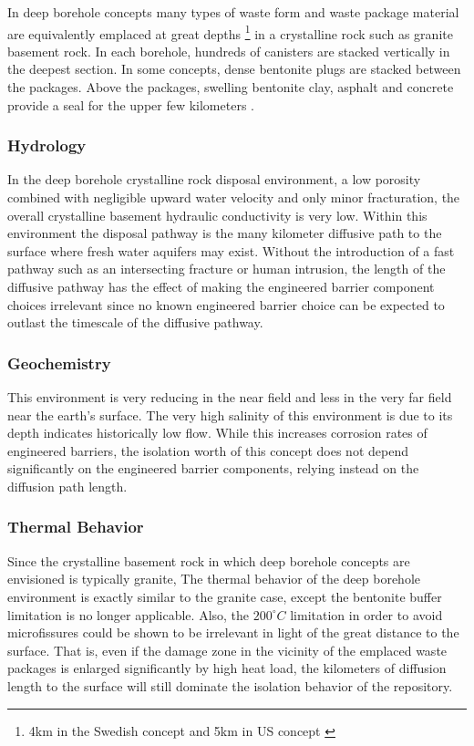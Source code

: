 In deep borehole concepts many types of  waste form and waste package material 
are equivalently emplaced at great depths \footnote{4km in the Swedish concept 
and 5km in \gls{US} concept \cite{hardin_generic_2011, clayton_generic_2011} }
in a crystalline rock such as granite basement rock. In each borehole, hundreds
of canisters are stacked vertically in the deepest section. In some concepts, 
dense bentonite plugs are stacked between the packages. Above the packages, 
swelling bentonite clay, asphalt and concrete provide a seal for the upper few 
kilometers \cite{clayton_generic_2011}. 

\subsubsection{Hydrology}

In the deep borehole crystalline rock disposal environment, a low porosity
combined with negligible upward water velocity and only minor fracturation, the
overall crystalline basement hydraulic conductivity is very low. Within this 
environment the disposal pathway is the many kilometer diffusive path to the 
surface where fresh water aquifers may exist\cite{clayton_generic_2011}.
Without the introduction of a fast 
pathway such as an intersecting fracture or human intrusion, the length of the
diffusive pathway has the effect of making the engineered barrier component 
choices irrelevant since no known engineered barrier choice can be expected to 
outlast the timescale of the diffusive pathway.

\subsubsection{Geochemistry}

This environment is very reducing in the near field and less in the very 
far field near the earth's surface. The very high salinity of this environment
is due to its depth indicates historically low flow. While this increases 
corrosion rates of engineered barriers, the isolation worth of this concept 
does not depend significantly on the engineered barrier components, relying 
instead on the diffusion path length.  


\subsubsection{Thermal Behavior}
\label{subsec:boreholethermal}

Since the crystalline basement rock in which deep borehole concepts are 
envisioned is typically granite, The thermal behavior of the deep borehole 
environment is exactly similar to the granite case, except the bentonite buffer 
limitation is no longer applicable.  Also, the $200^{\circ}C$ limitation in 
order to avoid microfissures could  be shown to be irrelevant in light of the 
great distance to the surface. That is, even if the damage zone in the vicinity 
of the emplaced waste packages is enlarged significantly by high heat load, 
the kilometers of diffusion length to the surface will still dominate the 
isolation behavior of the repository. 


